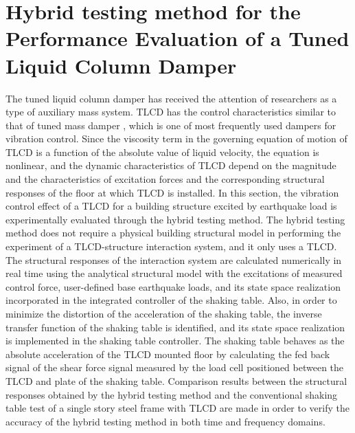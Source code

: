 \section{Hybrid testing method for the Performance Evaluation of a Tuned Liquid Column Damper}
\label{chap:4}

The tuned liquid column damper has received the attention of researchers as a type of auxiliary mass system\citep{samali1998wind}. TLCD has the control characteristics similar to that of tuned mass damper , which is one of most frequently used dampers for vibration control. Since the viscosity term in the governing equation of motion of TLCD is a function of the absolute value of liquid velocity, the equation is nonlinear, and the dynamic characteristics of TLCD depend on the magnitude and the characteristics of excitation forces and the corresponding structural responses of the floor at which TLCD is installed\citep{yalla2001liquid}.
In this section, the vibration control effect of a TLCD for a building structure excited by earthquake load is experimentally evaluated through the hybrid testing method. The hybrid testing method does not require a physical building structural model in performing the experiment of a TLCD-structure interaction system, and it only uses a TLCD. The structural responses of the interaction system are calculated numerically in real time using the analytical structural model with the excitations of measured control force, user-defined base earthquake loads, and its state space realization incorporated in the integrated controller of the shaking table. Also, in order to minimize the distortion of the acceleration of the shaking table, the inverse transfer function of the shaking table is identified, and its state space realization is implemented in the shaking table controller. The shaking table behaves as the absolute acceleration of the TLCD mounted floor by calculating the fed back signal of the shear force signal measured by the load cell positioned between the TLCD and plate of the shaking table. Comparison results between the structural responses obtained by the hybrid testing method and the conventional shaking table test of a single story steel frame with TLCD are made in order to verify the accuracy of the hybrid testing method in both time and frequency domains.

